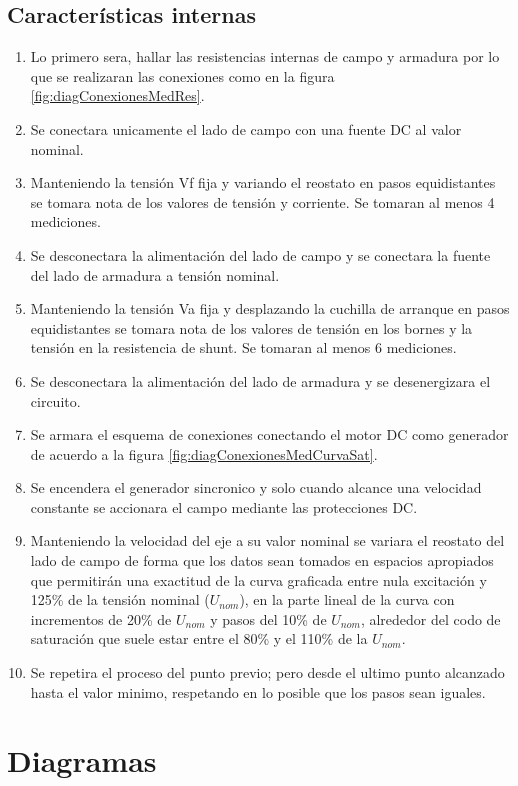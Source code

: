 \documentclass[11pt,letterpaper]{article}     %
\begin{document}
\subsection{Características internas}
\begin{enumerate}
    \item Lo primero sera, hallar las resistencias internas de campo y armadura por lo que se realizaran las conexiones como en la figura \ref{fig:diagConexionesMedRes}.
    \item Se conectara unicamente el lado de campo con una fuente DC al valor nominal.
    \item Manteniendo la tensión Vf fija y variando el reostato en pasos equidistantes se tomara nota de los valores de tensión y corriente. Se tomaran al menos 4 mediciones.
    \item Se desconectara la alimentación del lado de campo y se conectara la fuente del lado de armadura a tensión nominal.
    \item Manteniendo la tensión Va fija y desplazando la cuchilla de arranque en pasos equidistantes se tomara nota de los valores de tensión en los bornes y la tensión en la resistencia de shunt. Se tomaran al menos 6 mediciones.
    \item Se desconectara la alimentación del lado de armadura y se desenergizara el circuito.
    \item Se armara el esquema de conexiones conectando el motor DC como generador de acuerdo a la figura \ref{fig:diagConexionesMedCurvaSat}.
    \item Se encendera el generador sincronico y solo cuando alcance una velocidad constante se accionara el campo mediante las protecciones DC.
    \item Manteniendo la velocidad del eje a su valor nominal se variara el reostato del lado de campo de forma que los datos sean tomados en espacios apropiados que permitirán una exactitud de la curva graficada entre nula excitación y 125\% de la tensión nominal ($U_{nom}$), en la parte lineal de la curva con incrementos de 20\% de $U_{nom}$ y pasos del 10\% de $U_{nom}$,
    alrededor del codo de saturación que suele estar entre el 80\% y el 110\% de la $U_{nom}$.  
    \item Se repetira el proceso del punto previo; pero desde el ultimo punto alcanzado hasta el valor minimo, respetando en lo posible que los pasos sean iguales.
\end{enumerate}
\section{Diagramas}
\end{document}
